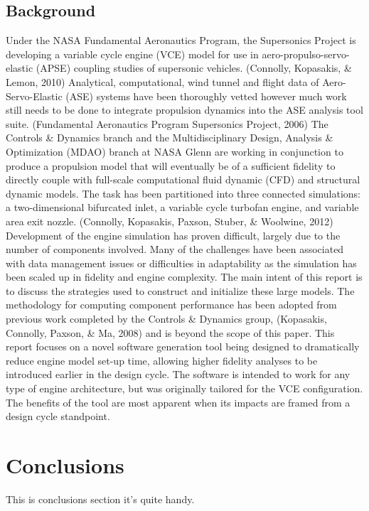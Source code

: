 \documentclass[heading.tex]{subfiles}
\begin{document}
\subsection{Background}
Under the NASA Fundamental Aeronautics Program, the Supersonics Project is developing a variable cycle engine (VCE) model for use in aero-propulso-servo-elastic (APSE) coupling studies of supersonic vehicles. (Connolly, Kopasakis, \& Lemon, 2010) Analytical, computational, wind tunnel and flight data of Aero-Servo-Elastic (ASE) systems have been thoroughly vetted however much work still needs to be done to integrate propulsion dynamics into the ASE analysis tool suite. (Fundamental Aeronautics Program Supersonics Project, 2006)
The Controls \& Dynamics branch and the Multidisciplinary Design, Analysis \& Optimization (MDAO) branch at NASA Glenn are working in conjunction to produce a propulsion model that will eventually be of a sufficient fidelity to directly couple with full-scale computational fluid dynamic (CFD) and structural dynamic models. The task has been partitioned into three connected simulations: a two-dimensional bifurcated inlet, a variable cycle turbofan engine, and variable area exit nozzle. (Connolly, Kopasakis, Paxson, Stuber, \& Woolwine, 2012) 
Development of the engine simulation has proven difficult, largely due to the number of components involved. Many of the challenges have been associated with data management issues or difficulties in adaptability as the simulation has been scaled up in fidelity and engine complexity. The main intent of this report is to discuss the strategies used to construct and initialize these large models.  The methodology for computing component performance has been adopted from previous work completed by the Controls \& Dynamics group, (Kopasakis, Connolly, Paxson, \& Ma, 2008) and is beyond the scope of this paper.
This report focuses on a novel software generation tool being designed to dramatically reduce engine model set-up time, allowing higher fidelity analyses to be introduced earlier in the design cycle. The software is intended to work for any type of engine architecture, but was originally tailored for the VCE configuration. The benefits of the tool are most apparent when its impacts are framed from a design cycle standpoint.

\section{Conclusions}
This is conclusions section it's quite handy.
\end{document}
